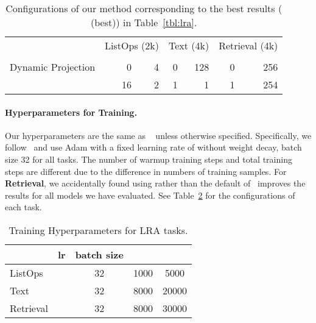\begin{table}[tbh!]
\centering
\caption{ Configurations of our method corresponding to the best results (\shortname{} (best)) in Table~\ref{tbl:lra}.}\label{tbl:lra_configs}
\begin{tabular}{l|rr|rr|rr}
\toprule
\multirow{2}{*}{ }
& \multicolumn{2}{c|}{ListOps (2k)} & \multicolumn{2}{c|}{Text (4k)} & \multicolumn{2}{c}{Retrieval (4k)} \\


&              &            &           &            &              &              \\
\midrule
Dynamic Projection          & {  0}             & 4           & {  0}          & 128         & 0             & 256           \\
\shortname{}             & 16            & 2           & 1          & 1           &       1        &        254      \\
\bottomrule
\end{tabular}
\end{table}

\paragraph{Hyperparameters for Training.} Our hyperparameters are the same as \nformer{}~\cite{xiong2021nformer} unless otherwise specified. Specifically, we follow~\cite{xiong2021nformer} and use Adam with a fixed learning rate of  without weight decay, batch size 32 for all tasks. The number of warmup training steps  and total training steps  are different due to the difference in numbers of training samples. For \textbf{Retrieval}, we accidentally found using  rather than the default  of~\cite{xiong2021nformer} improves the results for all models we have evaluated. See Table~\ref{tbl:lra_hparams} for the configurations of each task.
\begin{table}[htbp!]
\centering
\caption{Training Hyperparameters for LRA tasks.}\label{tbl:lra_hparams}
\begin{tabular}{lcccc}
\toprule
          & lr          & batch size &    &      \\
\midrule
ListOps   &    & 32         & 1000 & 5000  \\
Text      &    & 32         & 8000 & 20000 \\
Retrieval &    & 32         & 8000 & 30000 \\
\bottomrule
\end{tabular}
\end{table}

